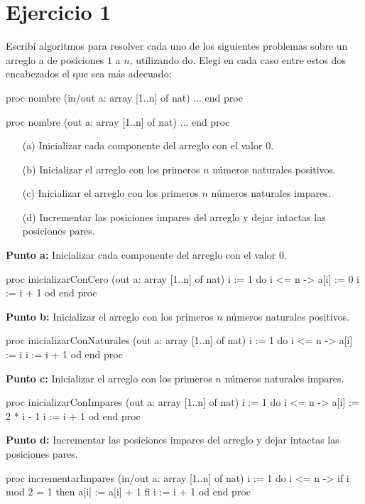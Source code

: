 \documentclass{article}
\begin{document}
\section*{Ejercicio 1}
Escribí algoritmos para resolver cada uno de los siguientes problemas sobre un arreglo a de posiciones $1$ a $n$, utilizando do. Elegí en cada caso entre estos dos encabezados el que sea más adecuado:

\begin{pascallike}
proc nombre (in/out a: array [1..n] of nat)
    ...
end proc
\end{pascallike}
\begin{pascallike}
proc nombre (out a: array [1..n] of nat)
    ...
end proc
\end{pascallike}
\begin{itemize}
    \item[(a)] Inicializar cada componente del arreglo con el valor $0$.
    \item[(b)] Inicializar el arreglo con los primeros $n$ números naturales positivos.
    \item[(c)] Inicializar el arreglo con los primeros $n$ números naturales impares.
    \item[(d)] Incrementar las posiciones impares del arreglo y dejar intactas las posiciones pares.  
\end{itemize}
\textbf{Punto a:} Inicializar cada componente del arreglo con el valor $0$.
\begin{pascallike}
proc inicializarConCero (out a: array [1..n] of nat)
  i := 1
  do i <= n -> 
    a[i] := 0
    i := i + 1
  od
end proc
\end{pascallike}

\textbf{Punto b:} Inicializar el arreglo con los primeros $n$ números naturales positivos.
\begin{pascallike}
proc inicializarConNaturales (out a: array [1..n] of nat)
  i := 1
  do i <= n -> 
    a[i] := i
    i := i + 1
  od
end proc
\end{pascallike}

\textbf{Punto c:} Inicializar el arreglo con los primeros $n$ números naturales impares.
\begin{pascallike}
proc inicializarConImpares (out a: array [1..n] of nat)
  i := 1
  do i <= n -> 
    a[i] := 2 * i - 1
    i := i + 1
  od
end proc
\end{pascallike}

\newpage
\textbf{Punto d:} Incrementar las posiciones impares del arreglo y dejar intactas las posiciones pares.
\begin{pascallike}
proc incrementarImpares (in/out a: array [1..n] of nat)
  i := 1
  do i <= n -> 
    if i mod 2 = 1 then
      a[i] := a[i] + 1
    fi
    i := i + 1
  od
end proc
\end{pascallike}
\end{document}
